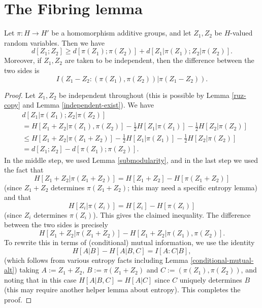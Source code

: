 \chapter{The Fibring lemma}

\begin{proposition}\label{projections-1}
  \leanok
  Let $\pi : H \to H'$ be a homomorphism additive groups, and let $Z_1,Z_2$ be $H$-valued random variables. Then we have
  \[
    d[Z_1; Z_2] \geq d[\pi(Z_1);\pi(Z_2)] + d[Z_1|\pi(Z_1); Z_2 |\pi(Z_2)].
  \]
  Moreover, if $Z_1,Z_2$ are taken to be independent, then the difference between the two sides is
$$I( Z_1 - Z_2 : (\pi(Z_1), \pi(Z_2))  |  \pi(Z_1 - Z_2) ).$$
\end{proposition}


\begin{proof}
  Let $Z_1,Z_2$ be independent throughout (this is possible by Lemma \ref{ruz-copy} and Lemma \ref{independent-exist}).  We have
  \begin{align*}
    & d[Z_1  |\pi(Z_1); Z_2 |\pi(Z_2)] \\
    & = H[ Z_1 + Z_2 | \pi(Z_1),\pi(Z_2)] - \tfrac{1}{2} H[Z_1 | \pi(Z_1)] - \tfrac{1}{2} H[Z_2 | \pi(Z_2)] \\
    & \leq  H[ Z_1 + Z_2 | \pi(Z_1+Z_2)]  - \tfrac{1}{2} H[Z_1 | \pi(Z_1)] - \tfrac{1}{2}H[Z_2 | \pi(Z_2)] \\
    & = d[Z_1;Z_2] - d[\pi(Z_1);\pi(Z_2)].
  \end{align*}
  In the middle step, we used Lemma \ref{submodularity}, and in the last step we used the fact that
  \[ H[Z_1 + Z_2 |  \pi(Z_1+Z_2)] = H[Z_1 + Z_2] - H[\pi(Z_1+Z_2)]\]
  (since $Z_1 + Z_2$ determines $\pi(Z_1 + Z_2)$; this may need a specific entropy lemma) and that
  \[ H[Z_i| \pi(Z_i)] = H[Z_i] - H[\pi(Z_i)]\] (since $Z_i$ determines $\pi(Z_i)$).
  This gives the claimed inequality. The difference between the two sides is precisely
  \[ H[Z_1 + Z_2  | \pi(Z_1 + Z_2)] - H[Z_1 + Z_2  | \pi(Z_1),\pi(Z_2)].\]
  To rewrite this in terms of (conditional) mutual information, we use the identity
  \[ H[A|B] - H[A | B,C] = I[A : C | B],\]
  (which follows from various entropy facts including Lemma \ref{conditional-mutual-alt})
  taking
  $A := Z_1 + Z_2$, $B := \pi(Z_1 + Z_2)$ and $C := (\pi(Z_1),\pi(Z_{2}))$, and noting that in this case $H[A | B,C] = H[A | C]$ since $C$ uniquely determines $B$ (this may require another helper lemma about entropy).
  This completes the proof.
\end{proof}

